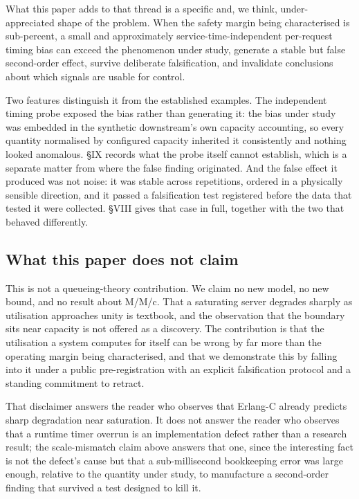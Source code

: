 \documentclass{ieeeaccess}
\begin{document}
What this paper adds to that thread is a specific and, we think, under-appreciated shape of the problem. When the safety margin being characterised is sub-percent, a small and approximately service-time-independent per-request timing bias can exceed the phenomenon under study, generate a stable but false second-order effect, survive deliberate falsification, and invalidate conclusions about which signals are usable for control.

Two features distinguish it from the established examples. The independent timing probe exposed the bias rather than generating it: the bias under study was embedded in the synthetic downstream's own capacity accounting, so every quantity normalised by configured capacity inherited it consistently and nothing looked anomalous. \S{}IX records what the probe itself cannot establish, which is a separate matter from where the false finding originated. And the false effect it produced was not noise: it was stable across repetitions, ordered in a physically sensible direction, and it passed a falsification test registered before the data that tested it were collected. \S{}VIII gives that case in full, together with the two that behaved differently.

\subsection{What this paper does not claim}

This is not a queueing-theory contribution. We claim no new model, no new bound, and no result about M/M/c. That a saturating server degrades sharply as utilisation approaches unity is textbook, and the observation that the boundary sits near capacity is not offered as a discovery. The contribution is that the utilisation a system computes for itself can be wrong by far more than the operating margin being characterised, and that we demonstrate this by falling into it under a public pre-registration with an explicit falsification protocol and a standing commitment to retract.

That disclaimer answers the reader who observes that Erlang-C already predicts sharp degradation near saturation. It does not answer the reader who observes that a runtime timer overrun is an implementation defect rather than a research result; the scale-mismatch claim above answers that one, since the interesting fact is not the defect's cause but that a sub-millisecond bookkeeping error was large enough, relative to the quantity under study, to manufacture a second-order finding that survived a test designed to kill it.
\end{document}
